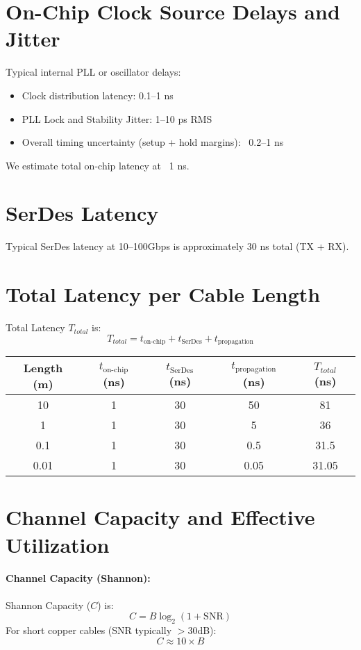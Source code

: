 \documentclass[../HFT-main.tex]{subfiles} %
\begin{document}
\section{On-Chip Clock Source Delays and Jitter}
Typical internal PLL or oscillator delays:
\begin{itemize}
	\item Clock distribution latency: 0.1–1 ns
	\item PLL Lock and Stability Jitter: 1–10 ps RMS
	\item Overall timing uncertainty (setup + hold margins): ~0.2–1 ns
\end{itemize}
We estimate total on-chip latency at ~1 ns.

\section{SerDes Latency}
Typical SerDes latency at 10–100Gbps is approximately 30 ns total (TX + RX).

\section{Total Latency per Cable Length}

Total Latency $T_{total}$ is:
\[
T_{total} = t_{\text{on-chip}} + t_{\text{SerDes}} + t_{\text{propagation}}
\]

\begin{tabular}{@{}ccccc@{}}
\toprule
Length (m) & $t_{\text{on-chip}}$ (ns) & $t_{\text{SerDes}}$ (ns) & $t_{\text{propagation}}$ (ns) & $T_{total}$ (ns) \\
\midrule
10 & 1 & 30 & 50 & 81 \\
1 & 1 & 30 & 5 & 36 \\
0.1 & 1 & 30 & 0.5 & 31.5 \\
0.01 & 1 & 30 & 0.05 & 31.05 \\
\bottomrule
\end{tabular}

\section{Channel Capacity and Effective Utilization}

\paragraph{Channel Capacity (Shannon):}
Shannon Capacity ($C$) is:
\[
C = B \log_2(1 + \text{SNR})
\]
For short copper cables (SNR typically $>30$dB):
\[C \approx 10 \times B\]
\end{document}
